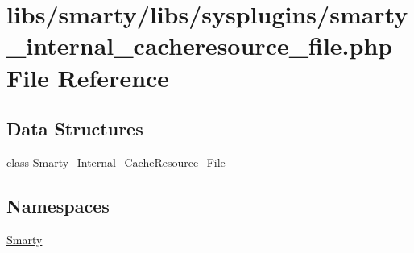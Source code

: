 \hypertarget{smarty__internal__cacheresource__file_8php}{}\section{libs/smarty/libs/sysplugins/smarty\+\_\+internal\+\_\+cacheresource\+\_\+file.php File Reference}
\label{smarty__internal__cacheresource__file_8php}
\subsection*{Data Structures}
\begin{DoxyCompactItemize}
\item 
class \hyperlink{class_smarty___internal___cache_resource___file}{Smarty\+\_\+\+Internal\+\_\+\+Cache\+Resource\+\_\+\+File}
\end{DoxyCompactItemize}
\subsection*{Namespaces}
\begin{DoxyCompactItemize}
\item 
 \hyperlink{namespace_smarty}{Smarty}
\end{DoxyCompactItemize}
